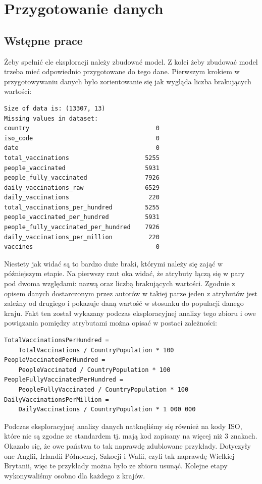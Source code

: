 \documentclass[12pt, oneside]{article}
\begin{document}
\section{Przygotowanie danych}

\subsection{Wstępne prace}

Żeby spełnić cle eksploracji należy zbudować model. Z kolei żeby zbudować model trzeba mieć odpowiednio przygotowane do tego dane. Pierwszym krokiem w przygotowywaniu danych było zorientowanie się jak wygląda liczba brakujących wartości:
\newpage
\begin{verbatim}
Size of data is: (13307, 13)
Missing values in dataset: 
country                                   0
iso_code                                  0
date                                      0
total_vaccinations                     5255
people_vaccinated                      5931
people_fully_vaccinated                7926
daily_vaccinations_raw                 6529
daily_vaccinations                      220
total_vaccinations_per_hundred         5255
people_vaccinated_per_hundred          5931
people_fully_vaccinated_per_hundred    7926
daily_vaccinations_per_million          220
vaccines                                  0
\end{verbatim}

Niestety jak widać są to bardzo duże braki, którymi należy się zająć w późniejszym etapie. Na pierwszy rzut oka widać, że atrybuty łączą się w pary pod dwoma względami: nazwą oraz liczbą brakujących wartości. Zgodnie z opisem danych dostarczonym przez autorów w takiej parze jeden z atrybutów jest zależny od drugiego i pokazuje daną wartość w stosunku do populacji danego kraju. Fakt ten został wykazany podczas eksploracyjnej analizy tego zbioru i owe powiązania pomiędzy atrybutami można opisać w postaci zależności:

\begin{Verbatim}[tabsize=4]
TotalVaccinationsPerHundred = 
	TotalVaccinations / CountryPopulation * 100
PeopleVaccinatedPerHundred = 
	PeopleVaccinated / CountryPopulation * 100
PeopleFullyVaccinatedPerHundred = 
	PeopleFullyVaccinated / CountryPopulation * 100
DailyVaccinationsPerMillion = 
	DailyVaccinations / CountryPopulation * 1 000 000
\end{Verbatim}

Podczas eksploracyjnej analizy danych natknęliśmy się również na kody ISO, które nie są zgodne ze standardem tj. mają kod zapisany na więcej niż 3 znakach. Okazało się, że owe państwa to tak naprawdę zdublowane przykłady. Dotyczyły one Anglii, Irlandii Północnej, Szkocji i Walii, czyli tak naprawdę Wielkiej Brytanii, więc te przykłady można było ze zbioru usunąć. Kolejne etapy wykonywaliśmy osobno dla każdego z krajów. 
\end{document}
